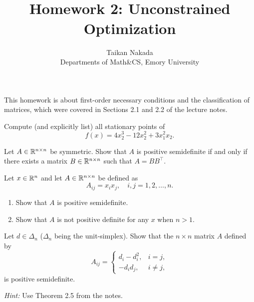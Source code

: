 \documentclass{article}
\title{\\Homework 2: Unconstrained Optimization}
\author{Taikan Nakada\\ Departments of Math\&CS, Emory University}
\begin{document}
	
	This homework is about first-order necessary conditions and the classification of matrices, which were covered in Sections 2.1 and 2.2 of the lecture notes. 
	
	\begin{ex}
		Compute (and explicitly list) all stationary points of
		\begin{equation*}
				f(x) = 4 x_2^3- 12 x_2^2 + 3 x_1^2 x_2.
		\end{equation*}
	\end{ex}

	
	\begin{ex}
		Let $A\in\mathbb{R}^{n\times n}$  be symmetric. Show that $A$ is positive semidefinite if and only if there exists a matrix $B \in \mathbb{R}^{n\times n}$ such that $A = B B^\top$.
	\end{ex}


	\begin{ex}
		Let $x\in \mathbb{R}^n$ and let $A\in\mathbb{R}^{n\times n}$  be defined as
			\begin{equation*}
				A_{ij} = x_i x_j, \quad i,j=1,2,\ldots,n.
			\end{equation*}
		\begin{enumerate}
			\item Show that $A$ is positive semidefinite.
			\item Show that $A$ is not positive definite for any $x$ when $n>1$.
		\end{enumerate}	
	\end{ex}
	

	
	\begin{ex}
	Let $d \in \Delta_n$ ($\Delta_n$ being the unit-simplex). Show that the $n\times n$ matrix $A$ defined by 
	$$
	A_{ij} = \begin{cases}
	d_i - d_i^2, & i = j, \\
	-d_i d_j, & i \neq j,
	\end{cases}
	$$
	is positive semidefinite.
	
	\emph{Hint:} Use Theorem 2.5 from the notes.
	\end{ex}

	
\end{document}
